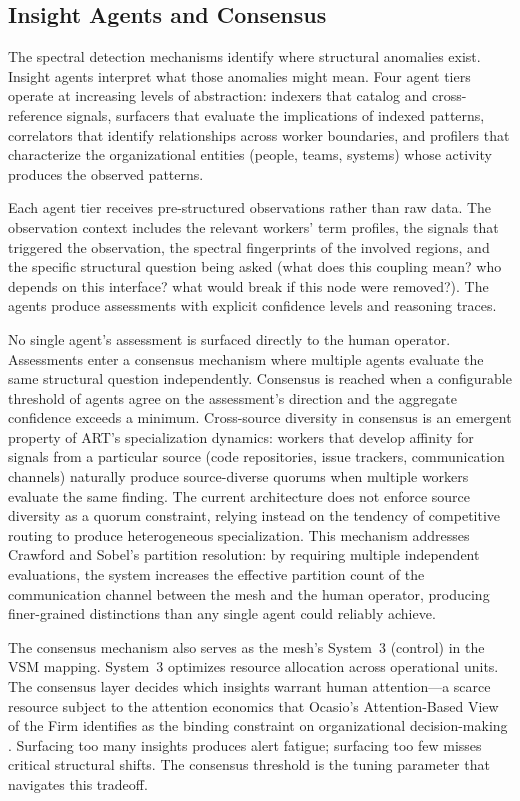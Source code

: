 \documentclass[11pt,a4paper]{article}
\begin{document}
\subsection{Insight Agents and Consensus}
\label{sec:consensus}

The spectral detection mechanisms identify where structural anomalies exist. Insight agents interpret what those anomalies might mean. Four agent tiers operate at increasing levels of abstraction: indexers that catalog and cross-reference signals, surfacers that evaluate the implications of indexed patterns, correlators that identify relationships across worker boundaries, and profilers that characterize the organizational entities (people, teams, systems) whose activity produces the observed patterns.

Each agent tier receives pre-structured observations rather than raw data. The observation context includes the relevant workers' term profiles, the signals that triggered the observation, the spectral fingerprints of the involved regions, and the specific structural question being asked (what does this coupling mean? who depends on this interface? what would break if this node were removed?). The agents produce assessments with explicit confidence levels and reasoning traces.

No single agent's assessment is surfaced directly to the human operator. Assessments enter a consensus mechanism where multiple agents evaluate the same structural question independently. Consensus is reached when a configurable threshold of agents agree on the assessment's direction and the aggregate confidence exceeds a minimum. Cross-source diversity in consensus is an emergent property of ART's specialization dynamics: workers that develop affinity for signals from a particular source (code repositories, issue trackers, communication channels) naturally produce source-diverse quorums when multiple workers evaluate the same finding. The current architecture does not enforce source diversity as a quorum constraint, relying instead on the tendency of competitive routing to produce heterogeneous specialization. This mechanism addresses Crawford and Sobel's partition resolution: by requiring multiple independent evaluations, the system increases the effective partition count of the communication channel between the mesh and the human operator, producing finer-grained distinctions than any single agent could reliably achieve.

The consensus mechanism also serves as the mesh's System~3 (control) in the VSM mapping. System~3 optimizes resource allocation across operational units. The consensus layer decides which insights warrant human attention---a scarce resource subject to the attention economics that Ocasio's Attention-Based View of the Firm identifies as the binding constraint on organizational decision-making \citep{ocasio1997}. Surfacing too many insights produces alert fatigue; surfacing too few misses critical structural shifts. The consensus threshold is the tuning parameter that navigates this tradeoff.
\end{document}
